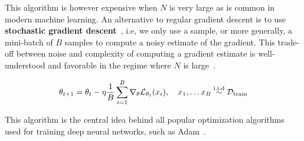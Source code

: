 This algorithm is however expensive when $N$ is very large as is common in
modern machine learning. An alternative to regular gradient descent is to use
\textbf{stochastic gradient descent}~\citep{robbins1951stochastic}, i.e, we only use a sample, or more generally, a mini-batch of $B$ samples to compute a noisy estimate of the gradient. This trade-off between noise and complexity of computing a gradient estimate is well-understood and favorable in the regime where $N$ is large~\citep{tradeoffs2007bottou}.

\begin{equation}
\label{eq:stochastic_gradient_descent}
    \theta_{t+1} = \theta_t - \eta \frac{1}{B} \sum_{i=1}^B \nabla_\theta {\mathcal{L}}_{\theta_t}(x_i), \quad x_1, \dots x_B \stackrel{\footnotesize{\text{i.i.d}}}{\sim} {\mathcal{D}}_\text{train}
\end{equation}

This algorithm is the central idea behind all popular optimization algorithms used for training deep neural networks, such as Adam~\citep{kingma2014adam}.
